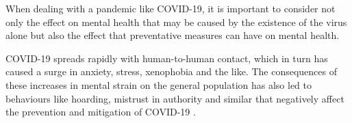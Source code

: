 When dealing with a pandemic like COVID-19, it is important to consider not only the effect on mental health that may be caused by the existence of the virus alone but also the effect that preventative measures can have on mental health.

COVID-19 spreads rapidly with human-to-human contact, which in turn has caused a surge in anxiety, stress, xenophobia and the like. The consequences of these increases in mental strain on the general population has also led to behaviours like hoarding, mistrust in authority and similar that negatively affect the prevention and mitigation of COVID-19 \citep{javed_coronavirus_2020}.